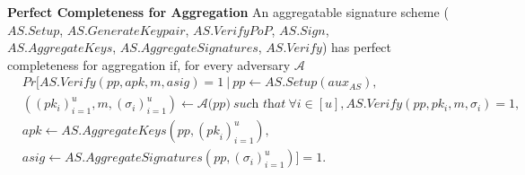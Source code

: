 \vspace{-0.02in}
\noindent \textbf{Perfect Completeness for Aggregation} An aggregatable signature scheme 
($\mathit{AS.Setup}$, $\mathit{AS.GenerateKeypair}$, $\mathit{AS.VerifyPoP}$, $\mathit{AS.Sign}$, \\
$\mathit{AS.AggregateKeys}$, $\mathit{AS.AggregateSignatures}$, $\mathit{AS.Verify}$)
has perfect completeness for aggregation if, for every adversary $\mathcal{A}$
\begin{align*}
& \mathit{Pr}[\mathit{AS.Verify}(\mathit{pp}, \mathit{apk}, m, \mathit{asig}) = 1 \ | \ \mathit{pp} \leftarrow \mathit{AS.Setup}(\mathit{aux_{\mathit{AS}}}), \\
& ((\mathit{pk_i})_{i=1}^u, m, (\sigma_i)_{i=1}^{u}) \leftarrow \mathcal{A}(\mathit{\mathit{pp})} \ 
\textit{such that} \ \forall i \in [u], \mathit{AS.Verify}(\mathit{pp}, \mathit{pk_i}, m, \sigma_i) = 1, \\
& \mathit{apk} \leftarrow \mathit{AS.AggregateKeys}(\mathit{pp},  (\mathit{pk}_{i})_{i=1}^{u}), \\
&  \mathit{asig} \leftarrow \mathit{AS.AggregateSignatures}(\mathit{pp}, (\sigma_i)_{i=1}^u)] = 1.
\end{align*}

